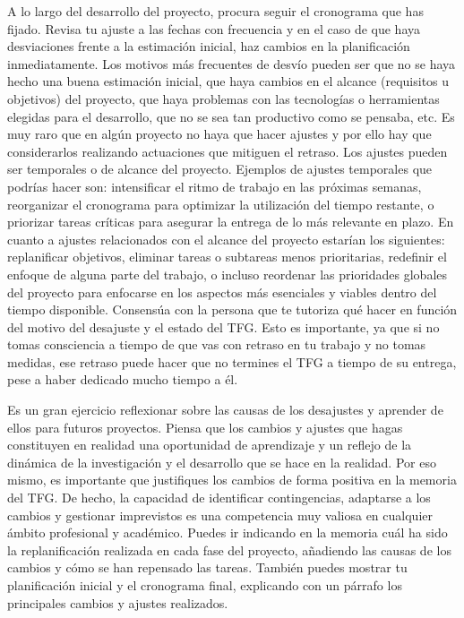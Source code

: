 A lo largo del desarrollo del proyecto, procura seguir el cronograma que has fijado. Revisa tu ajuste a las fechas con frecuencia y en el caso de que haya desviaciones frente a la estimación inicial, haz cambios en la planificación inmediatamente. Los motivos más frecuentes de desvío pueden ser que no se haya hecho una buena estimación inicial, que haya cambios en el alcance (requisitos u objetivos) del proyecto, que haya problemas con las tecnologías o herramientas elegidas para el desarrollo, que no se sea tan productivo como se pensaba, etc. Es muy raro que en algún proyecto no haya que hacer ajustes y por ello hay que considerarlos realizando actuaciones que mitiguen el retraso. Los ajustes pueden ser temporales o de alcance del proyecto. Ejemplos de ajustes temporales que podrías hacer son: intensificar el ritmo de trabajo en las próximas semanas, reorganizar el cronograma para optimizar la utilización del tiempo restante, o priorizar tareas críticas para asegurar la entrega de lo más relevante en plazo. En cuanto a ajustes relacionados con el alcance del proyecto estarían los siguientes:  replanificar objetivos, eliminar tareas o subtareas menos prioritarias, redefinir el enfoque de alguna parte del trabajo, o incluso reordenar las prioridades globales del proyecto para enfocarse en los aspectos más esenciales y viables dentro del tiempo disponible. Consensúa con la persona que te tutoriza qué hacer en función del motivo del desajuste y el estado del TFG. Esto es importante, ya que si no tomas consciencia a tiempo de que vas con retraso en tu trabajo y no tomas medidas, ese retraso puede hacer que no termines el TFG a tiempo de su entrega, pese a haber dedicado mucho tiempo a él. 

Es un gran ejercicio reflexionar sobre las causas de los desajustes y aprender de ellos para futuros proyectos. Piensa que los cambios y ajustes que hagas constituyen en realidad una oportunidad de aprendizaje y un reflejo de la dinámica de la investigación y el desarrollo que se hace en la realidad. Por eso mismo, es importante que justifiques los cambios de forma positiva en la memoria del TFG. De hecho, la capacidad de identificar contingencias, adaptarse a los cambios y gestionar imprevistos es una competencia muy valiosa en cualquier ámbito profesional y académico. Puedes ir indicando en la memoria cuál ha sido la replanificación realizada en cada fase del proyecto, añadiendo las causas de los cambios y cómo se han repensado las tareas. También puedes mostrar tu planificación inicial y el cronograma final, explicando con un párrafo los principales cambios y ajustes realizados.

